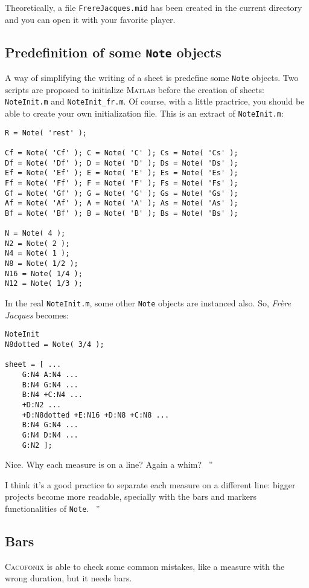 \documentclass{article}
\newcommand{\cacofonix}{\textsc{Cacofonix}\xspace}
\newcommand{\matlab}{\textsc{Matlab}\xspace}
\newcommand{\note}{\lstinline!Note!\xspace}
\newcommand{\frerejaques}{\emph{Fr\`ere Jacques}\xspace}
\newcommand{\file}[1]{\texttt{#1}\xspace}
\newcommand{\noteInitFile}{\file{NoteInit.m}}
\newcommand{\noteInitFrFile}{\file{NoteInit\_fr.m}}
\newenvironment{meenv}{ \par \noindent \makebox[6em][r]{ \textcolor{mecolor}{Me}: `` --~}}{~''}
\newenvironment{myselfenv}{ \par \noindent \makebox[6em][r]{ \textcolor{myselfcolor}{Myself}: `` --~}}{~''}
\newcommand{ \me }[1]{%
\begin{meenv}%
	#1%
\end{meenv} }
\newcommand{ \myself }[1]{%
\begin{myselfenv}%
	#1%
\end{myselfenv} }
\begin{document}
Theoretically, a file \file{FrereJacques.mid} has been created in the current directory and you can open it with your favorite player.

\subsection{Predefinition of some \note objects}

A way of simplifying the writing of a sheet is predefine some \note objects. Two scripts are proposed to initialize \matlab before the creation of sheets: \noteInitFile and \noteInitFrFile. Of course, with a little practrice, you should be able to create your own initialization file. This is an extract of \noteInitFile:
\begin{lstlisting}
R = Note( 'rest' );

Cf = Note( 'Cf' ); C = Note( 'C' ); Cs = Note( 'Cs' );
Df = Note( 'Df' ); D = Note( 'D' ); Ds = Note( 'Ds' );
Ef = Note( 'Ef' ); E = Note( 'E' ); Es = Note( 'Es' );
Ff = Note( 'Ff' ); F = Note( 'F' ); Fs = Note( 'Fs' );
Gf = Note( 'Gf' ); G = Note( 'G' ); Gs = Note( 'Gs' );
Af = Note( 'Af' ); A = Note( 'A' ); As = Note( 'As' );
Bf = Note( 'Bf' ); B = Note( 'B' ); Bs = Note( 'Bs' );

N = Note( 4 );
N2 = Note( 2 );
N4 = Note( 1 );
N8 = Note( 1/2 );
N16 = Note( 1/4 );
N12 = Note( 1/3 );
\end{lstlisting}

In the real \noteInitFile, some other \note objects are instanced also. So, \frerejaques becomes:
\begin{lstlisting}
NoteInit
N8dotted = Note( 3/4 );

sheet = [ ...
	G:N4 A:N4 ...
	B:N4 G:N4 ...
	B:N4 +C:N4 ...
	+D:N2 ...
	+D:N8dotted +E:N16 +D:N8 +C:N8 ...
	B:N4 G:N4 ...
	G:N4 D:N4 ...
	G:N2 ];
\end{lstlisting}

\me{Nice. Why each measure is on a line? Again a whim?}
\myself{I think it's a good practice to separate each measure on a different line: bigger projects become more readable, specially with the bars and markers functionalities of \note.}

\subsection{Bars}

\cacofonix is able to check some common mistakes, like a measure with the wrong duration, but it needs bars.
\end{document}
